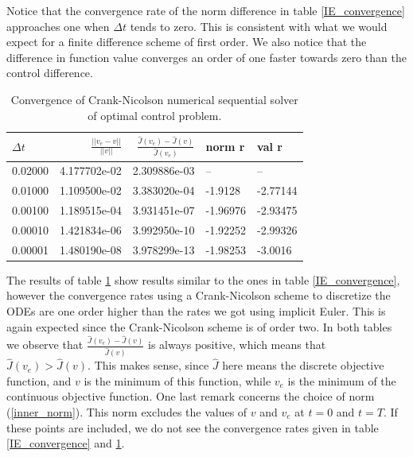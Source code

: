 Notice that the convergence rate of the norm difference in table \ref{IE_convergence} approaches one when $\Delta t$ tends to zero. This is consistent with what we would expect for a finite difference scheme of first order. We also notice that the difference in function value converges an order of one faster towards zero than the control difference.  
\begin{table}[h]
\caption{Convergence of Crank-Nicolson numerical sequential solver of optimal control problem.}\label{CN_convergence}
\centering
\begin{tabular}{lrrll}
\toprule
{} $\Delta t$&    $\frac{||v_e-v||}{||v||}$ &  $\frac{\hat J(v_e)-\hat J(v)}{\hat J(v_e)}$ &   norm r &    val r \\
\midrule
0.02000 &  4.177702e-02 &  2.309886e-03 &       -- &       -- \\
0.01000 &  1.109500e-02 &  3.383020e-04 &  -1.9128 & -2.77144 \\
0.00100 &  1.189515e-04 &  3.931451e-07 & -1.96976 & -2.93475 \\
0.00010 &  1.421834e-06 &  3.992950e-10 & -1.92252 & -2.99326 \\
0.00001 &  1.480190e-08 &  3.978299e-13 & -1.98253 &  -3.0016 \\
\bottomrule
\end{tabular}
\end{table}
The results of table \ref{CN_convergence} show results similar to the ones in table \ref{IE_convergence}, however the convergence rates using a Crank-Nicolson scheme to discretize the ODEs are one order higher than the rates we got using implicit Euler. This is again expected since the Crank-Nicolson scheme is of order two. In both tables we observe that $\frac{\hat J(v_e)-\hat J(v)}{\hat J(v)}$ is always positive, which means that $\hat J(v_e)>\hat J(v)$. This makes sense, since $\hat J$ here means the discrete objective function, and $v$ is the minimum of this function, while $v_e$ is the minimum of the continuous objective function. One last remark concerns the choice of norm (\ref{inner_norm}). This norm excludes the values of $v$ and $v_e$ at $t=0$ and $t=T$. If these points are included, we do not see the convergence rates given in table \ref{IE_convergence} and \ref{CN_convergence}. 
